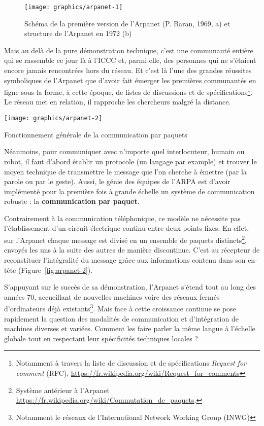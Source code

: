 \documentclass[symmetric,justified,marginals=raggedouter]{tufte-book}
\begin{document}
\begin{figure*}
  \texttt{[image: graphics/arpanet-1]}
  \caption{Schéma de la première version de l'Arpanet (P. Baran, 1969, a) et structure de l'Arpanet en 1972 (b)}
  \label{fig:arpanet-1}
\end{figure*} 

\noindent Mais au delà de la pure démonstration technique, c'est une communauté entière qui se rassemble ce jour là à l'ICCC et, parmi elle, des personnes qui ne s'étaient encore jamais rencontrées hors du réseau. Et c'est là l'une des grandes réussites symboliques de l'Arpanet que d'avoir fait émerger les premières communautés en ligne sous la forme, à cette époque, de listes de discussions et de spécifications\footnote{\RaggedOuter Notamment à travers la liste de discussion et de spécifications \textit{Request for comment} (RFC), \url{https://fr.wikipedia.org/wiki/Request\_for\_comments}}. Le réseau met en relation, il rapproche les chercheurs malgré la distance. 

\newpage 

\begin{marginfigure}%
  \texttt{[image: graphics/arpanet-2]}
  \vspace*{0.2cm}  
  \caption{Fonctionnement générale de la communication par paquets}
  \label{fig:arpanet-2}
\end{marginfigure} 

Néanmoins, pour communiquer avec n'importe quel interlocuteur, humain ou robot, il faut d'abord établir un protocole (un langage par example) et trouver le moyen technique de transmettre le message que l'on cherche à émettre (par la parole ou par le geste). Aussi, le génie des équipes de l'ARPA est d'avoir implémenté pour la première fois à grande échelle un système de communication robuste : la \textbf{communication par paquet}. 

Contrairement à la communication téléphonique, ce modèle ne nécessite pas l'établissement d'un circuit électrique continu entre deux points fixes. En effet, sur l'Arpanet chaque message est divisé en un ensemble de paquets distincts\footnote{\RaggedOuter Système antérieur à l'Arpanet \url{https://fr.wikipedia.org/wiki/Commutation\_de\_paquets}.}, envoyés les uns à la suite des autres de manière discontinue. C'est au récepteur de reconstituer l'intégralité du message grâce aux informations contenu dans son en-tête (Figure~\ref{fig:arpanet-2}). 

S'appuyant sur le succès de sa démonstration, l'Arpanet s'étend tout au long des années 70, accueillant de nouvelles machines voire des réseaux fermés d'ordinateurs déjà existants\footnote{\RaggedOuter Notamment le réseaux de l'International Network Working Group (INWG)}. Mais face à cette croissance continue se pose rapidement la question des modalités de communication et d'intégration de machines diverses et variées. Comment les faire parler la même langue à l'échelle globale tout en respectant leur spécificités techniques locales ? 
\end{document}
